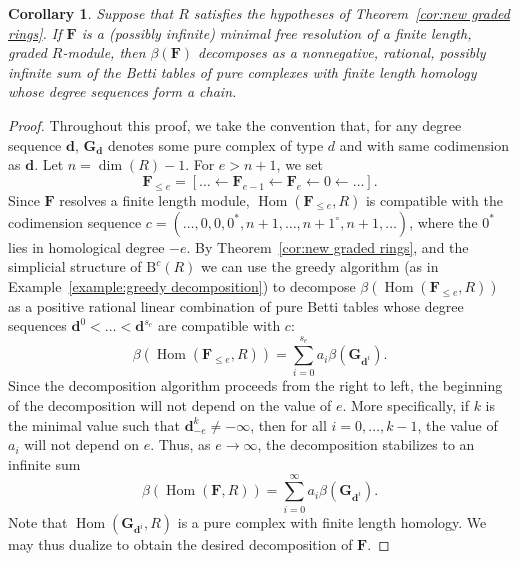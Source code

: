 \documentclass[12pt]{amsart}
\newtheorem{cor}[lemma]{Corollary}
\theoremstyle{definition}
\theoremstyle{remark}
\newtheorem{example}[lemma]{Example}
\newcommand{\Hom}{\operatorname{Hom}} %
\newcommand{\kk}{\Bbbk}
\newcommand{\QQ}{\mathbb{Q}}
\newcommand{\cc}{c}
\newcommand{\dd}{\mathbf{d}}
\newcommand{\FF}{\mathbf{F}}
\newcommand{\zp}{\circ}
\newcommand{\BBQ}{\mathrm{B}}
\begin{document}
\begin{cor}\label{cor:decomp infinite}
Suppose that $R$ satisfies the hypotheses of Theorem~\ref{cor:new graded rings}. If $\FF$ is a (possibly infinite) minimal free resolution of a finite length, graded $R$-module, then $\beta(\FF)$ decomposes as a nonnegative, rational, possibly infinite sum of the Betti tables of pure complexes with finite length homology whose degree sequences form a chain.
\end{cor}
\begin{proof}
Throughout this proof, we take the convention that, for any degree sequence $\dd$, $\mathbf{G}_{\dd}$ denotes some pure complex of type $d$ and with same codimension as $\dd$.  Let $n=\dim(R)-1$.  For $e> n+1$, we set
\[
\FF_{\leq e}=[\dots \gets \FF_{e-1}\gets \FF_e \gets 0 \gets \dots].
\]
Since $\FF$ resolves a finite length module, $\Hom(\FF_{\leq e},R)$ is compatible with the codimension sequence $\cc=(\dots,0,0,0^*,n+1,\dots, n+1^\zp, n+1,\dots)$, where the $0^*$ lies in homological degree $-e$.  By Theorem~\ref{cor:new graded rings}, and the simplicial structure of
$\BBQ^{\cc}(R)$ we can use the greedy algorithm (as in Example~\ref{example:greedy decomposition}) to decompose 
$\beta(\Hom(\FF_{\leq e},R))$ as a positive rational linear combination of pure Betti tables whose degree sequences $\dd^0<\dots <\dd^{s_e}$ are compatible with $\cc$:
\[
\beta(\Hom(\FF_{\leq e},R))=\sum_{i=0}^{s_e} a_{i}\beta(\mathbf{G}_{\dd^i}).
\]
%
Since the decomposition algorithm proceeds from the right to left, the beginning of the decomposition will not depend on the value of $e$.  More specifically, if
$k$ is the minimal value such that $\dd^k_{-e}\ne -\infty$, then for all $i=0, \dots, k-1$, the value of $a_i$ will not depend on $e$.   Thus, as $e\to \infty$, the decomposition stabilizes to an infinite sum
\[
\beta(\Hom(\FF,R))=\sum_{i=0}^\infty a_i\beta(\mathbf{G}_{\dd^i}).
\]
Note that $\Hom(\mathbf{G}_{\dd^i},R)$ is a pure complex with finite length homology.  We may thus dualize to obtain the desired decomposition of $\FF$.
\end{proof}
%
\end{document}
